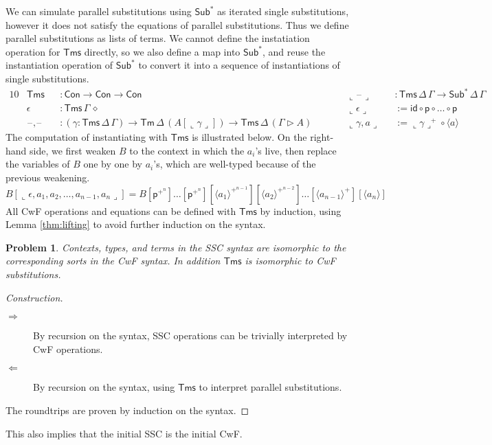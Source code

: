 \documentclass[a4paper,UKenglish,cleveref, autoref, thm-restate]{lipics-v2021}
\newtheorem{problem}[theorem]{Problem}
\newcommand{\ra}{\rightarrow}
\newcommand{\Tm}{\mathsf{Tm}}
\newcommand{\Con}{\mathsf{Con}}
\newcommand{\Sub}{\mathsf{Sub}}
\newcommand{\Tms}{\mathsf{Tms}}
\newcommand{\p}{\mathsf{p}}
\newcommand{\ext}{\mathop{\triangleright}}
\newcommand{\blank}{\mathord{\hspace{1pt}\text{--}\hspace{1pt}}} %
\newcommand{\id}{\mathsf{id}}
\begin{document}
We can simulate parallel substitutions using $\Sub^*$ as iterated single
substitutions, however it does not satisfy the equations of parallel
substitutions. Thus we define parallel substitutions as lists of terms. We
cannot define the instatiation operation for $\Tms$ directly, so we also define
a map into $\Sub^*$, and reuse the instantiation operation of $\Sub^*$ to
convert it into a sequence of instantiations of single substitutions.
\begin{alignat*}{10}
  & \Tms && : \Con\ra\Con\ra\Con && \llcorner\blank\lrcorner && : \Tms\,\Delta\,\Gamma \to \Sub^*\,\Delta\,\Gamma \\
  & \epsilon && : \Tms\,\Gamma\,\diamond && \llcorner\epsilon\lrcorner && := \id\circ\p\circ\dots\circ\p \\
  & \blank,\blank && : (\gamma:\Tms\,\Delta\,\Gamma)\ra\Tm\,\Delta\,(A[\llcorner\gamma\lrcorner])\ra\Tms\,\Delta\,(\Gamma\ext A)\hspace{2em} && \llcorner\gamma,a\lrcorner && := \llcorner\gamma\lrcorner^+\circ\langle a \rangle
\end{alignat*}
The computation of instantiating with $\Tms$ is illustrated below. On the
right-hand side, we first weaken $B$ to the context in which the $a_i$'s live,
then replace the variables of $B$ one by one by $a_i$'s, which are well-typed
because of the previous weakening.
\[
  B[\llcorner\epsilon,a_1,a_2,\dots,a_{n-1},a_n\lrcorner] = 
  B[\p^{+^n}]\dots[\p^{+^n}][\langle a_1 \rangle^{+^{n-1}}][\langle a_2 \rangle^{+^{n-2}}]\dots[\langle a_{n-1} \rangle^+][\langle a_n \rangle]
\]
All CwF operations and equations can be defined with $\Tms$ by induction, using
Lemma \ref{thm:lifting} to avoid further induction on the syntax.

\begin{problem}
  Contexts, types, and terms in the SSC syntax are isomorphic to the
  corresponding sorts in the CwF syntax. In addition $\Tms$ is isomorphic to CwF
  substitutions.
\end{problem}
\begin{proof}[Construction]\leavevmode
  \begin{description}
    \item[$\Rightarrow$] By recursion on the syntax, SSC operations can be
    trivially interpreted by CwF operations.
    \item[$\Leftarrow$] By recursion on the syntax, using $\Tms$ to interpret
    parallel substitutions.
  \end{description}
  The roundtrips are proven by induction on the syntax.
\end{proof}
This also implies that the initial SSC is the initial CwF.
\end{document}
